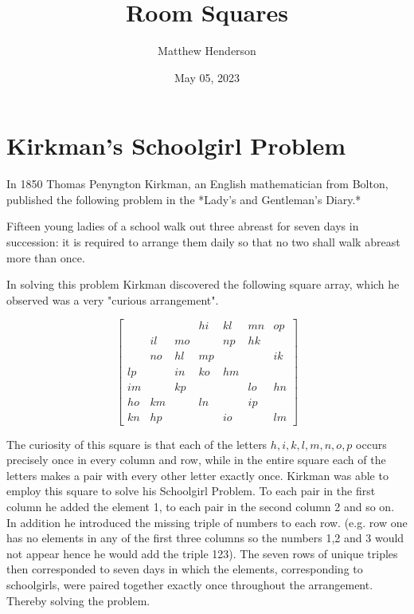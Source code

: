 \documentclass[
  11pt,
  a4paper]{book}\usepackage[]{graphicx}\usepackage[]{xcolor}
\title{Room Squares}
\author{Matthew Henderson}
\date{May 05, 2023}
\begin{document}
\chapter{Kirkman’s Schoolgirl Problem}

In 1850 Thomas Penyngton Kirkman, an English mathematician from Bolton, published the following problem in the *Lady’s and Gentleman’s Diary.*

Fifteen young ladies of a school walk out three abreast for seven days in succession: it is required to arrange them daily so that no two shall walk abreast more than once.

In solving this problem Kirkman discovered the following square array, which he observed was a very "curious arrangement".

\begin{equation}
  \label{eq:roomsquare}
  \begin{bmatrix}
       &    &    & hi & kl & mn & op \\
       & il & mo &    & np & hk &    \\
       & no & hl & mp &    &    & ik \\
    lp &    & in & ko & hm &    &    \\
    im &    & kp &    &    & lo & hn \\
    ho & km &    & ln &    & ip &    \\
    kn & hp &    &    & io &    & lm 
  \end{bmatrix}
\end{equation}

The curiosity of this square is that each of the letters $h, i, k, l, m, n, o, p$ occurs precisely once in every column and row, while in the entire square each of the letters makes a pair with every other letter exactly once.
Kirkman was able to employ this square to solve his Schoolgirl Problem.
To each pair in the first column he added the element 1, to each pair in the second column 2 and so on.
In addition he introduced the missing triple of numbers to each row.
(e.g. row one has no elements in any of the first three columns so the numbers 1,2 and 3 would not appear hence he would add the triple 123).
The seven rows of unique triples then corresponded to seven days in which the elements, corresponding to schoolgirls, were paired together exactly once throughout the arrangement.
Thereby solving the problem.
\end{document}
